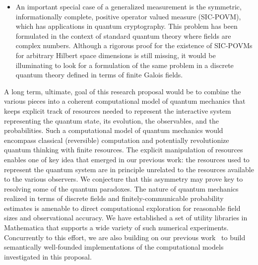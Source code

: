 \documentclass{article}
\theoremstyle{remark}
\begin{document}
\begin{itemize}
\item An important special case of a generalized measurement is the
  symmetric, informationally complete, positive operator valued
  measure (SIC-POVM), which has applications in quantum
  cryptography. This problem has been formulated in the context of
  standard quantum theory where fields are complex numbers.  Although
  a rigorous proof for the existence of SIC-POVMs for arbitrary
  Hilbert space dimensions is still missing, it would be illuminating
  to look for a formulation of the same problem in a discrete quantum
  theory defined in terms of finite Galois fields.
\end{itemize}

A long term, ultimate, goal of this research proposal would be to
combine the various pieces into a coherent computational model of
quantum mechanics that keeps explicit track of resources needed to
represent the interactive system representing the quantum state, its
evolution, the observables, and the probabilities. Such a
computational model of quantum mechanics would encompass classical
(reversible) computation and potentially revolutionize quantum
thinking with finite resources. The explicit manipulation of resources
enables one of key idea that emerged in our previous work: the
resources used to represent the quantum system are in principle
unrelated to the resources available to the various observers. We
conjecture that this asymmetry may prove key to resolving some of the
quantum paradoxes.  The nature of quantum mechanics realized in terms
of discrete fields and finitely-communicable probability estimates is
amenable to direct computational exploration for reasonable field
sizes and observational accuracy. We have established a set of utility
libraries in Mathematica that supports a wide variety of such
numerical experiments. Concurrently to this effort, we are also
building on our previous work~\cite
{VDS2009,AGVS2005,VAS2006,finiteQC,Sabry:2003:MQC:871895.871900}
to build semantically well-founded implementations of the
computational models investigated in this proposal.
\end{document}
